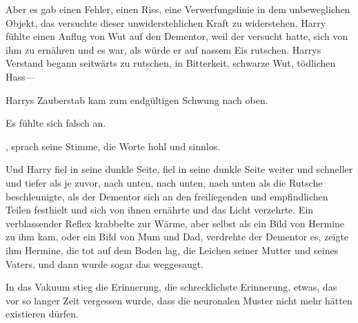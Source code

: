 Aber es gab einen Fehler, einen Riss, eine Verwerfungslinie in dem unbeweglichen Objekt, das versuchte dieser unwiderstehlichen Kraft zu widerstehen. Harry fühlte einen Anflug von Wut auf den Dementor, weil der versucht hatte, sich von ihm zu ernähren und es war, als würde er auf nassem Eis rutschen. Harrys Verstand begann seitwärts zu rutschen, in Bitterkeit, schwarze Wut, tödlichen Hass—

Harrys Zauberstab kam zum endgültigen Schwung nach oben.

Es fühlte sich falsch an.

, sprach seine Stimme, die Worte hohl und sinnlos.

Und Harry fiel in seine dunkle Seite, fiel in seine dunkle Seite weiter und schneller und tiefer als je zuvor, nach unten, nach unten, nach unten als die Rutsche beschleunigte, als der Dementor sich an den freiliegenden und empfindlichen Teilen festhielt und sich von ihnen ernährte und das Licht verzehrte. Ein verblassender Reflex krabbelte zur Wärme, aber selbst als ein Bild von Hermine zu ihm kam, oder ein Bild von Mum und Dad, verdrehte der Dementor es, zeigte ihm Hermine, die tot auf dem Boden lag, die Leichen seiner Mutter und seines Vaters, und dann wurde sogar das weggesaugt.

In das Vakuum stieg die Erinnerung, die schrecklichste Erinnerung, etwas, das vor so langer Zeit vergessen wurde, dass die neuronalen Muster nicht mehr hätten existieren dürfen.

